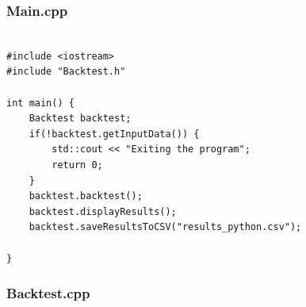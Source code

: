\documentclass[12pt,twoside]{article}
\begin{document}
\subsubsection{Main.cpp}
\scriptsize
\begin{verbatim}

#include <iostream>
#include "Backtest.h"

int main() {
    Backtest backtest;
    if(!backtest.getInputData()) {
        std::cout << "Exiting the program";
        return 0;
    }
    backtest.backtest();
    backtest.displayResults();
    backtest.saveResultsToCSV("results_python.csv");

}
\end{verbatim}
\subsubsection{Backtest.cpp}
\scriptsize
\end{document}
